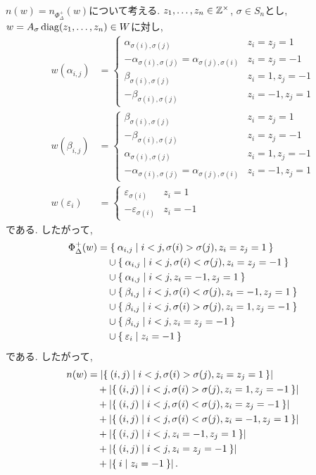 $n(w)=n_{\Phi_\Delta^+}(w)$について考える.
$z_1,\ldots,z_n\in \mathbb{Z}^\times$, $\sigma\in S_n$とし,
$w=A_\sigma \operatorname{diag}(z_1,\ldots,z_n) \in W$に対し,
\begin{align*}
  w(\alpha_{i,j})&=
  \begin{cases}
    \alpha_{\sigma(i),\sigma(j)}&z_i=z_j=1\\
    -\alpha_{\sigma(i),\sigma(j)}=\alpha_{\sigma(j),\sigma(i)}&z_i=z_j=-1\\
    \beta_{\sigma(i),\sigma(j)}&z_i=1,z_j=-1\\
    -\beta_{\sigma(i),\sigma(j)}&z_i=-1,z_j=1
  \end{cases}\\
  w(\beta_{i,j})&=
  \begin{cases}
    \beta_{\sigma(i),\sigma(j)}&z_i=z_j=1\\
    -\beta_{\sigma(i),\sigma(j)}&z_i=z_j=-1\\
    \alpha_{\sigma(i),\sigma(j)}&z_i=1,z_j=-1\\
    -\alpha_{\sigma(i),\sigma(j)}=\alpha_{\sigma(j),\sigma(i)}&z_i=-1,z_j=1
  \end{cases}\\
  w(\varepsilon_{i})&=
  \begin{cases}
    \varepsilon_{\sigma(i)}&z_i=1\\
    -\varepsilon_{\sigma(i)}&z_i=-1
  \end{cases}
\end{align*}
である.
したがって,
\begin{align*}
  \Phi_\Delta^+(w)
  &=
  \Set{\alpha_{i,j}|i<j,\sigma(i)>\sigma(j),z_i=z_j=1}\\
  &\quad \cup\Set{\alpha_{i,j}|i<j,\sigma(i)<\sigma(j),z_i=z_j=-1}\\
  &\quad \cup\Set{\alpha_{i,j}|i<j,z_i=-1,z_j=1}\\
  &\quad \cup\Set{\beta_{i,j}|i<j,\sigma(i)<\sigma(j),z_i=-1,z_j=1}\\
  &\quad \cup\Set{\beta_{i,j}|i<j,\sigma(i)>\sigma(j),z_i=1,z_j=-1}\\
  &\quad \cup\Set{\beta_{i,j}|i<j,z_i=z_j=-1}\\
  &\quad \cup\Set{\varepsilon_{i}|z_i=-1}
\end{align*}
である.
したがって,
\begin{align*}
  n(w)
  &=\left|\Set{(i,j)|i<j,\sigma(i)>\sigma(j),z_i=z_j=1}\right|\\
  &\quad +\left|\Set{(i,j)|i<j,\sigma(i)>\sigma(j),z_i=1,z_j=-1}\right|\\
  &\quad +\left|\Set{(i,j)|i<j,\sigma(i)<\sigma(j),z_i=z_j=-1}\right|\\
  &\quad +\left|\Set{(i,j)|i<j,\sigma(i)<\sigma(j),z_i=-1,z_j=1}\right|\\
  &\quad +\left|\Set{(i,j)|i<j,z_i=-1,z_j=1}\right|\\
  &\quad +\left|\Set{(i,j)|i<j,z_i=z_j=-1}\right|\\
  &\quad +\left|\Set{i|z_i=-1}\right|.
\end{align*}
